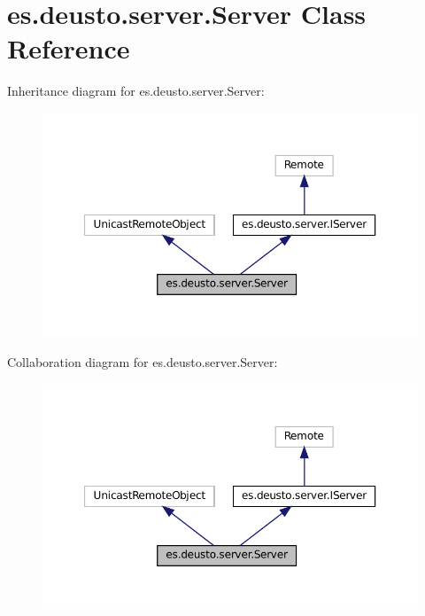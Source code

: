 \hypertarget{classes_1_1deusto_1_1server_1_1_server}{}\section{es.\+deusto.\+server.\+Server Class Reference}
\label{classes_1_1deusto_1_1server_1_1_server}


Inheritance diagram for es.\+deusto.\+server.\+Server\+:
\nopagebreak
\begin{figure}[H]
\begin{center}
\leavevmode
\includegraphics[width=350pt]{classes_1_1deusto_1_1server_1_1_server__inherit__graph}
\end{center}
\end{figure}


Collaboration diagram for es.\+deusto.\+server.\+Server\+:
\nopagebreak
\begin{figure}[H]
\begin{center}
\leavevmode
\includegraphics[width=350pt]{classes_1_1deusto_1_1server_1_1_server__coll__graph}
\end{center}
\end{figure}
